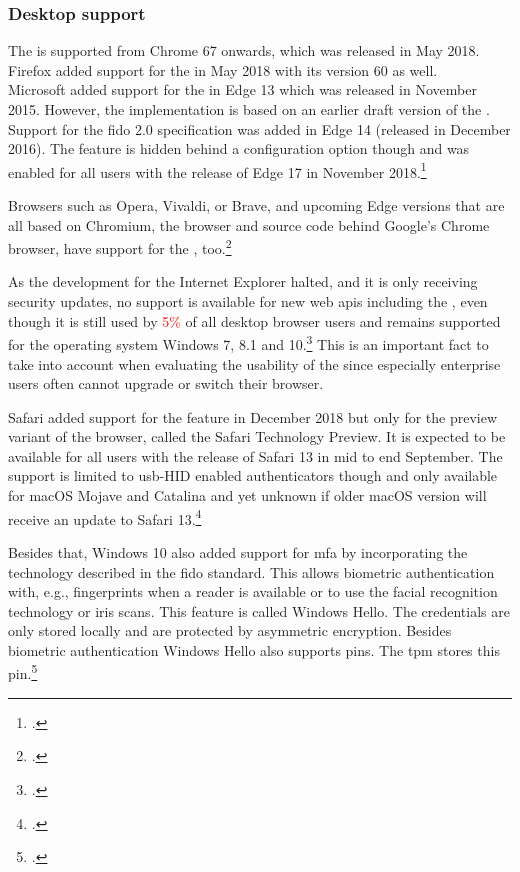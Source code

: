 \subsubsection{Desktop support}

The \wa{} is supported from Chrome 67 onwards, which was released in May 2018. Firefox added support for the \wa{} in May 2018 with its version 60 as well.\\
Microsoft added support for the \wa{} in Edge 13 which was released in November 2015. However, the implementation is based on an earlier draft version of the \wa. Support for the \gls{fido} 2.0 specification was added in Edge 14 (released in December 2016). The feature is hidden behind a configuration option though and was enabled for all users with the release of Edge 17 in November 2018.\footcite[See][112]{Jacobs:2019}

Browsers such as Opera, Vivaldi, or Brave, and upcoming Edge versions that are all based on Chromium, the browser and source code behind Google's Chrome browser, have support for the \wa, too.\footcites[See][Chapter 7.1]{kissell2019take}

As the development for the Internet Explorer halted, and it is only receiving security updates, no support is available for new web \glspl{api} including the \wa, even though it is still used by \textcolor{red}{5\%} of all desktop browser users and remains supported for the operating system Windows 7, 8.1 and 10.\footcite[See][]{ie-support}
 This is an important fact to take into account when evaluating the usability of the \wa{} since especially enterprise users often cannot upgrade or switch their browser.

Safari added support for the \wa{} feature in December 2018 but only for the preview variant of the browser, called the Safari Technology Preview. It is expected to be available for all users with the release of Safari 13 in mid to end September. The support is limited to \gls{usb}-HID enabled authenticators though and only available for macOS Mojave and Catalina and yet unknown if older macOS version will receive an update to Safari 13.\footcites[See][]{safari-webauthn}

Besides that, Windows 10 also added support for \gls{mfa} by incorporating the technology described in the \gls{fido} standard. This allows biometric authentication with, e.g., fingerprints when a reader is available or to use the facial recognition technology or iris scans. This feature is called \frqq Windows Hello\flqq{}. The credentials are only stored locally and are protected by asymmetric encryption. Besides biometric authentication Windows Hello also supports \glspl{pin}. The \gls{tpm} stores this \gls{pin}.\footcite[See][]{201612}

